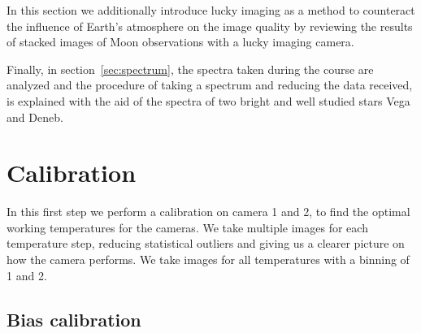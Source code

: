 \documentclass{article}
\begin{document}
In this section we additionally introduce lucky imaging as a method to counteract the influence of Earth's atmosphere on the image quality by reviewing the results of stacked images of Moon observations with a lucky imaging camera. 

Finally, in section~\ref{sec:spectrum}, the spectra taken during the course are analyzed and the procedure of taking a spectrum and reducing the data received, is explained with the aid of the spectra of two bright and well studied stars Vega and Deneb.

\section{Calibration}\label{sec:calibration}
In this first step we perform a calibration on camera 1 and 2, to find the optimal working temperatures for the cameras. We take multiple images for each temperature step, reducing statistical outliers and giving us a clearer picture on how the camera performs. We take images for all temperatures with a binning of 1 and 2.
\subsection{Bias calibration}\label{sec:bias_calib}
\end{document}
